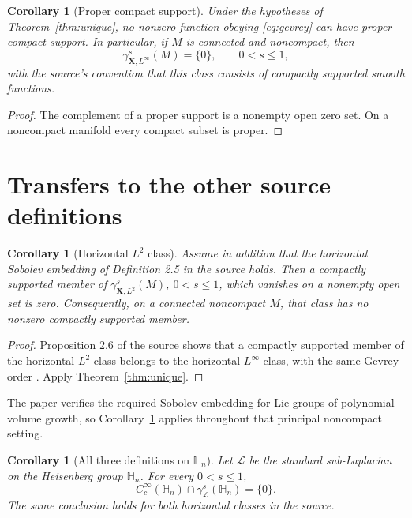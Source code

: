 \documentclass[11pt]{article}
\newtheorem{corollary}[theorem]{Corollary}
\newcommand{\X}{\mathbf X}
\begin{document}
\begin{corollary}[Proper compact support]\label{cor:compact}
Under the hypotheses of Theorem~\ref{thm:unique}, no nonzero function obeying
\eqref{eq:gevrey} can have proper compact support.  In particular, if \(M\) is
connected and noncompact, then
\[
 \gamma^s_{\X,L^\infty}(M)=\{0\},\qquad 0<s\le1,
\]
with the source's convention that this class consists of compactly supported
smooth functions.
\end{corollary}

\begin{proof}
The complement of a proper support is a nonempty open zero set.  On a
noncompact manifold every compact subset is proper.
\end{proof}

\section{Transfers to the other source definitions}

\begin{corollary}[Horizontal \(L^2\) class]\label{cor:l2}
Assume in addition that the horizontal Sobolev embedding of Definition 2.5 in
the source holds.  Then a compactly supported member of
\(\gamma^s_{\X,L^2}(M)\), \(0<s\le1\), which vanishes on a nonempty open set is
zero.  Consequently, on a connected noncompact \(M\), that class has no
nonzero compactly supported member.
\end{corollary}

\begin{proof}
Proposition 2.6 of the source shows that a compactly supported member of the
horizontal \(L^2\) class belongs to the horizontal \(L^\infty\) class, with
the same Gevrey order \cite{source}.  Apply Theorem~\ref{thm:unique}.
\end{proof}

The paper verifies the required Sobolev embedding for Lie groups of polynomial
volume growth, so Corollary~\ref{cor:l2} applies throughout that principal
noncompact setting.

\begin{corollary}[All three definitions on \(\mathbb H_n\)]\label{cor:heis}
Let \(\mathcal L\) be the standard sub-Laplacian on the Heisenberg group
\(\mathbb H_n\).  For every \(0<s\le1\),
\[
 C_c^\infty(\mathbb H_n)\cap\gamma^s_{\mathcal L}(\mathbb H_n)
 =\{0\}.
\]
The same conclusion holds for both horizontal classes in the source.
\end{corollary}
\end{document}

